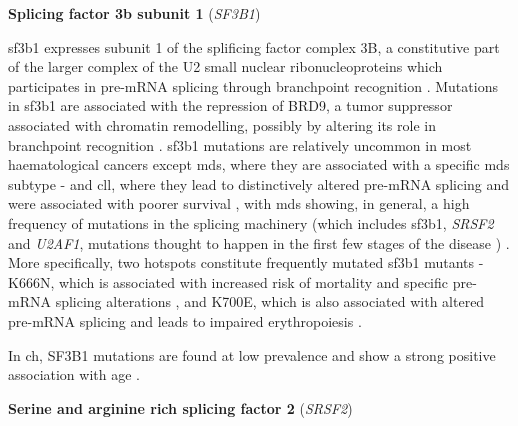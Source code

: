 \noindent \textbf{Splicing factor 3b subunit 1} (\textit{SF3B1})

\Ac{sf3b1} expresses subunit 1 of the splificing factor complex 3B, a constitutive part of the larger complex of the U2 small nuclear ribonucleoproteins which participates in pre-mRNA splicing \cite{Fica2013-vn,Kramer1995-mw,Isono2001-yf} through branchpoint recognition \cite{Gozani1998-ox}. Mutations in \ac{sf3b1} are associated with the repression of BRD9, a tumor suppressor associated with chromatin remodelling, possibly by altering its role in branchpoint recognition \cite{Inoue2019-ra}. \ac{sf3b1} mutations are relatively uncommon in most haematological cancers except \ac{mds}, where they are associated with a specific \ac{mds} subtype \cite{Papaemmanuil2011-nr,Hellstrom_Lindberg2015-zs} - and \ac{cll}, where they lead to distinctively altered pre-mRNA splicing and were associated with poorer survival \cite{Wang2011-wu,Quesada2011-xc}, with \ac{mds} showing, in general, a high frequency of mutations in the splicing machinery (which includes \ac{sf3b1}, \textit{SRSF2} and \textit{U2AF1}, mutations thought to happen in the first few stages of the disease \cite{Haferlach2014-bh,Papaemmanuil2013-yt,Nagata2019-hn}) \cite{Yoshida2011-zp}. More specifically, two hotspots constitute frequently mutated \ac{sf3b1} mutants - K666N, which is associated with increased risk of mortality and specific pre-mRNA splicing alterations \cite{Dalton2020-mg}, and K700E, which is also associated with altered pre-mRNA splicing and leads to impaired erythropoiesis \cite{Obeng2016-bw}.

In \ac{ch}, SF3B1 mutations are found at low prevalence \cite{Jaiswal2014-rl, Bolton2020-ct, Genovese2014-eu,Xie2014-np,Zink2017-zi,McKerrell2015-rl} and show a strong positive association with age \cite{Bolton2020-ct,Xie2014-np,McKerrell2015-rl}. 

\noindent \textbf{Serine and arginine rich splicing factor 2} (\textit{SRSF2})

